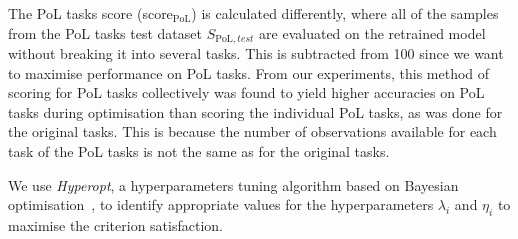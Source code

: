 The PoL tasks score (score$_{\text{PoL}}$) is calculated differently, where all of the samples from the PoL tasks test dataset $S_{\text{PoL}, test}$ are evaluated on the retrained model without breaking it into several tasks. This is subtracted from 100 since we want to maximise performance on PoL tasks.
%
%
From our experiments, this method of scoring for PoL tasks collectively was found to yield higher accuracies on PoL tasks during optimisation than scoring the individual PoL tasks, as was done for the original tasks. 
%
This is because the number of observations available for each task of the PoL tasks is not the same as for the original tasks. 

We use \textit{Hyperopt}, a hyperparameters tuning algorithm based on Bayesian optimisation~\cite{Mockus1975,Snoek2012,Feurer2019}, to identify appropriate values for the hyperparameters $\lambda_i$ and $\eta_i$ to maximise the criterion satisfaction.


